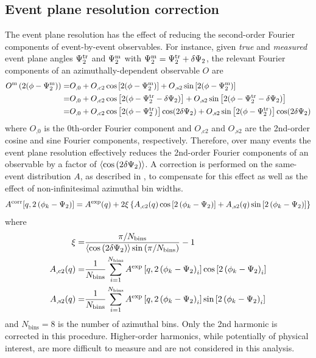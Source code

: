 \subsection{Event plane resolution correction}
\label{subsec:epres_corr}
The event plane resolution has the effect of reducing the second-order Fourier components of event-by-event observables.
For instance, given \emph{true} and \emph{measured} event plane angles $\Psi_{2}^\textrm{tr}$ and $\Psi_{2}^\textrm{m}$ with $\Psi_{2}^\textrm{m} = \Psi_{2}^\textrm{tr} + \delta\Psi_{2}$, the relevant Fourier components of an azimuthally-dependent observable $O$ are
\begin{align}
  O^\textrm{m} \left(2(\phi-\Psi_{2}^\textrm{m})\right) =& O_\textrm{,0} + O_\textrm{,c2} \cos\left[2(\phi - \Psi_{2}^\textrm{m})\right] + O_\textrm{,s2} \sin\left[2(\phi - \Psi_{2}^\textrm{m})\right]\\
  =& O_\textrm{,0} + O_\textrm{,c2} \cos\left[2(\phi - \Psi_{2}^\textrm{tr} - \delta\Psi_{2})\right] + O_\textrm{,s2} \sin\left[2(\phi - \Psi_{2}^\textrm{tr} - \delta\Psi_{2})\right]\\
  =& O_\textrm{,0} + O_\textrm{,c2} \cos\left[2(\phi - \Psi_{2}^\textrm{tr})\right] \cos(2\delta\Psi_{2}) + O_\textrm{,s2} \sin\left[2(\phi - \Psi_{2}^\textrm{tr})\right] \cos(2\delta\Psi_{2})
\end{align}
where $O_\textrm{,0}$ is the 0th-order Fourier component and $O_\textrm{,c2}$ and $O_\textrm{,s2}$ are the 2nd-order cosine and sine Fourier components, respectively.
Therefore, over many events the event plane resolution effectively reduces the 2nd-order Fourier components of an observable by a factor of $\langle \cos\left(2\delta\Psi_{2}\right) \rangle$.
A correction is performed on the same-event distribution $A$, as described in , to compensate for this effect as well as the effect of non-infinitesimal azimuthal bin widths.
\begin{equation}
  \label{eq:a_corr}
  A^\textrm{corr}[q,2\left(\phi_{k}-\Psi_{2}\right)] = A^\textrm{exp}(q) + 2\xi \left\{ A_\textrm{,c2}(q) \cos\left[2\left(\phi_{k}-\Psi_{2}\right)\right] + A_\textrm{,s2}(q) \sin\left[2\left(\phi_{k}-\Psi_{2}\right)\right] \right\}
\end{equation}
where
\begin{align}
  \xi =& \frac{\pi/N_\textrm{bins}}{\langle \cos\left(2\delta\Psi_{2}\right) \rangle \sin\left(\pi/N_\textrm{bins}\right)} - 1 \label{eq:xi_def} \\
  A_{,\textrm{c}2}(q) =& \frac{1}{N_\textrm{bins}} \sum_{i=1}^{N_\textrm{bins}} A^\textrm{exp}\left[q,2\left(\phi_{k}-\Psi_{2}\right)_i \right] \cos \left[ 2\left(\phi_{k}-\Psi_{2}\right)_i \right] \\ 
  A_{,\textrm{s}2}(q) =& \frac{1}{N_\textrm{bins}} \sum_{i=1}^{N_\textrm{bins}} A^\textrm{exp}\left[q,2\left(\phi_{k}-\Psi_{2}\right)_i \right] \sin \left[ 2\left(\phi_{k}-\Psi_{2}\right)_i \right]
\end{align}
and $N_\textrm{bins} = 8$ is the number of azimuthal bins.
Only the 2nd harmonic is corrected in this procedure. Higher-order harmonics, while potentially of physical interest, are more difficult to measure and are not considered in this analysis.

